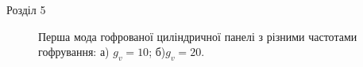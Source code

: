 \documentclass[8pt]{beamer}
\numberwithin{figure}{section}
\numberwithin{equation}{section}
\numberwithin{table}{section}
\begin{document}
\begin{frame}{Розділ 5}
\begin{figure}[h]
\begin{minipage}[h]{0.49\linewidth}
\end{minipage}
\hfill
\begin{minipage}[h]{0.49\linewidth}
\end{minipage}
\caption{Перша мода гофрованої циліндричної панелі з різними частотами гофрування: а) $g_v=10$; б)$g_v=20$.}
\end{figure}


\end{frame}
\end{document}
